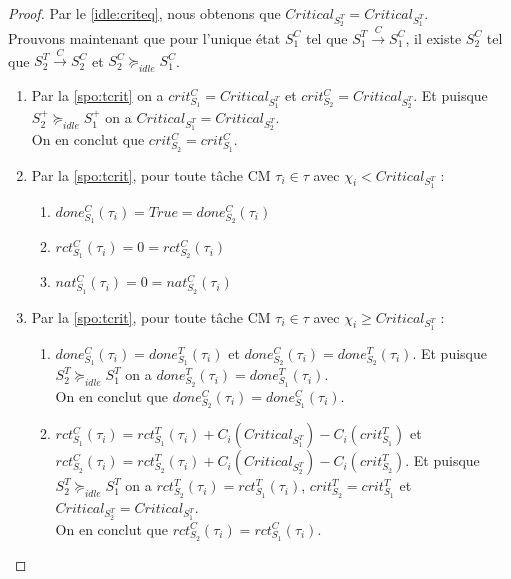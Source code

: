 \documentclass[12pt,a4paper,oneside]{book}
\theoremstyle{break}
\theoremstyle{breakplain}
\begin{document}
\begin{proof}
\pagebreak

Par le \autoref{idle:criteq}, nous obtenons que $Critical_{S_2^T} = Critical_{S_1^T}$.\\

Prouvons maintenant que pour l'unique état $S_1^C$ tel que $S^{T}_1\xrightarrow{C}S^{C}_1$, il existe $S_2^C$ tel que $S^{T}_2\xrightarrow{C}S^{C}_2$ et $S^C_2 \succeq_{idle} S^C_1$.

\begin{enumerate}

\item Par la \autoref{spo:tcrit} on a $crit_{S_1}^C = Critical_{S_1^T}$ et $crit_{S_2}^C = Critical_{S_2^T}$. Et puisque $S^+_2 \succeq_{idle} S^+_1$ on a $Critical_{S_1^T} = Critical_{S_2^T}$.\\
On en conclut que $crit_{S_2}^C= crit_{S_1}^C$.

\item Par la \autoref{spo:tcrit}, pour toute tâche CM $\tau_i \in \tau$ avec $\chi_i < Critical_{S_1^T}$ :
\begin{enumerate}[label=(\alph*)]
\item $done_{S_1}^C(\tau_i) = True = done_{S_2}^C(\tau_i)$
\item $rct_{S_1}^C(\tau_i) = 0 = rct_{S_2}^C(\tau_i)$
\item $nat_{S_1}^C(\tau_i) = 0 = nat_{S_2}^C(\tau_i)$
\end{enumerate}

\item Par la \autoref{spo:tcrit}, pour toute tâche CM $\tau_i \in \tau$ avec $\chi_i \geq Critical_{S_1^T}$ :
\begin{enumerate}[label=(\alph*)]
\item \label{idle:crit:done} $done_{S_1}^C(\tau_i) = done_{S_1}^T(\tau_i)$ et $done_{S_2}^C(\tau_i) = done_{S_2}^T(\tau_i)$. Et puisque $S^T_2 \succeq_{idle} S^T_1$ on a $done_{S_2}^T(\tau_i)= done_{S_1}^T(\tau_i)$.\\
On en conclut que $done_{S_2}^C(\tau_i) = done_{S_1}^C(\tau_i)$.

\item $rct_{S_1}^C(\tau_i) = rct_{S_1}^T(\tau_i)+C_i(Critical_{S_1^T})-C_i(crit_{S_1}^T)$ et $rct_{S_2}^C(\tau_i) = rct_{S_2}^T(\tau_i)+C_i(Critical_{S_2^T})-C_i(crit_{S_2}^T)$. Et puisque $S^T_2 \succeq_{idle} S^T_1$ on a $rct_{S_2}^T(\tau_i) = rct_{S_1}^T(\tau_i)$, $crit_{S_2}^T = crit_{S_1}^T$ et $Critical_{S_2^T} = Critical_{S_1^T}$.\\
On en conclut que $rct_{S_2}^C(\tau_i) = rct_{S_1}^C(\tau_i)$.


\end{enumerate}
\end{enumerate}
\end{proof}
\end{document}
